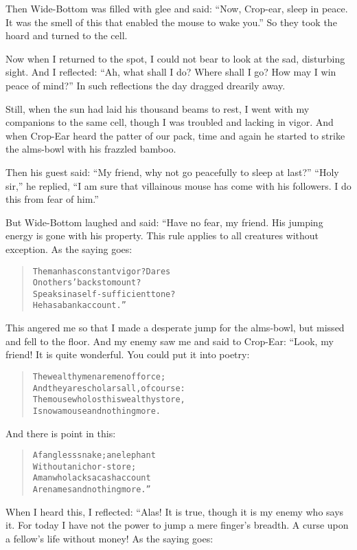 \documentclass[article, twoside, 14pt]{memoir}
\renewenvironment{verbatim}{%
\begin{quote}%
\vskip -10pt%
\begin{alltt}\normalfont\large}{\end{alltt}%
\end{quote}%
\vskip -10pt
} %
\begin{document}
Then Wide-Bottom was filled with glee and said:
``Now, Crop-ear, sleep in peace. It was the smell of this that enabled the mouse to wake you.''
So they took the hoard and turned to the cell.

Now when I returned to the spot, I could not bear to look at the
sad, disturbing sight. And I reflected:
``Ah, what shall I do? Where shall I go? How may I win peace of mind?''
In such reflections the day dragged drearily away.

Still, when the sun had laid his thousand beams to rest, I went
with my companions to the same cell, though I was troubled and
lacking in vigor. And when Crop-Ear heard the patter of our pack,
time and again he started to strike the alms-bowl with his frazzled
bamboo.

Then his guest said:
``My friend, why not go peacefully to sleep at last?''
``Holy sir,'' he replied,
``I am sure that villainous mouse has come with his followers. I do this from fear of him.''

But Wide-Bottom laughed and said: “Have no fear, my friend. His
jumping energy is gone with his property. This rule applies to all
creatures without exception. As the saying goes:

\begin{verbatim}
The man has constant vigor? Dares
    On others' backs to mount?
Speaks in a self-sufficient tone?
    He has a bank account.”
\end{verbatim}
This angered me so that I made a desperate jump for the alms-bowl,
but missed and fell to the floor. And my enemy saw me and said to
Crop-Ear: “Look, my friend! It is quite wonderful. You could put it
into poetry:

\begin{verbatim}
The wealthy men are men of force;
And they are scholars all, of course:
The mouse who lost his wealthy store,
Is now a mouse and nothing more.
\end{verbatim}
And there is point in this:

\begin{verbatim}
A fangless snake; an elephant
Without an ichor-store;
A man who lacks a cash account{\textemdash}
Are names and nothing more.”
\end{verbatim}
When I heard this, I reflected: “Alas! It is true, though it is my
enemy who says it. For today I have not the power to jump a mere
finger's breadth. A curse upon a fellow's life without money! As
the saying goes:
\end{document}
